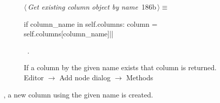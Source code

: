 \documentclass[%
    a4paper,    %
    justified,  %
    nobib,      %
    openany     %
]{tufte-book}
\makeatletter
\renewcommand{\label}[1]{\@tufte@label{##1}}%
\makeatother
\begin{document}
\begin{figure}[!htbp]
\begin{flushleft} \small
\begin{minipage}{\linewidth}\label{scrap164}\raggedright\small
{} $\langle\,${\itshape Get existing column object by name}\nobreak\ {\footnotesize {186b}}$\,\rangle\equiv$
\vspace{-1ex}
\begin{pythoncode}
if column_name in self.columns:
    column = self.columns[column_name]|\NWsep|
\end{pythoncode}
\vspace{1.5ex}
\footnotesize
\begin{list}{}{\setlength{\itemsep}{-\parsep}\setlength{\itemindent}{-\leftmargin}}
\item \NWtxtMacroRefIn\ .

\item{}
\end{list}
\end{minipage}\vspace{4ex}
\end{flushleft}
\caption{If a column by the given name exists that column is returned.
  \newline{}\newline{}Editor $\rightarrow$ Add node dialog $\rightarrow$ Methods}
\end{figure}

, a new column using the given
name is created.
\end{document}
